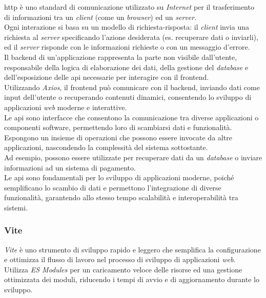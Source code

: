 \noindent \gls{http} è uno standard di comunicazione utilizzato su \textit{Internet} per il trasferimento di informazioni tra un \textit{client} (come un \textit{browser}) ed un \textit{server}.\\
Ogni interazione si basa su un modello di richiesta-risposta: il \textit{client} invia una richiesta al \textit{server} specificando l’azione desiderata (es. recuperare dati o inviarli), ed il \textit{server} risponde con le informazioni richieste o con un messaggio d’errore.\\

\noindent Il \gls{backend} di un’applicazione rappresenta la parte non visibile dall'utente, responsabile della logica di elaborazione dei dati, della gestione del \textit{database} e dell’esposizione delle \gls{api} necessarie per interagire con il \gls{frontend}.\\
Utilizzando \textit{Axios}, il \gls{frontend} può comunicare con il \gls{backend}, inviando dati come input dell’utente o recuperando contenuti dinamici, consentendo lo sviluppo di applicazioni \textit{web} moderne e interattive.\\

\noindent Le \gls{api} sono interfacce che consentono la comunicazione tra diverse applicazioni o componenti software, permettendo loro di scambiarsi dati e funzionalità. \\
Espongono un insieme di operazioni che possono essere invocate da altre applicazioni, nascondendo la complessità del sistema sottostante.\\
Ad esempio, possono essere utilizzate per recuperare dati da un \textit{database} o inviare informazioni ad un sistema di pagamento.\\

\noindent Le \gls{api} sono fondamentali per lo sviluppo di applicazioni moderne, poiché semplificano lo scambio di dati e permettono l’integrazione di diverse funzionalità, garantendo allo stesso tempo scalabilità e interoperabilità tra sistemi.

\subsubsection{Vite}

\textit{Vite} è uno strumento di sviluppo rapido e leggero che semplifica la configurazione e ottimizza il flusso di lavoro nel processo di sviluppo di applicazioni \textit{web}. \\
Utilizza \textit{ES Modules} per un caricamento veloce delle risorse ed una gestione ottimizzata dei moduli, riducendo i tempi di avvio e di aggiornamento durante lo sviluppo.\\

